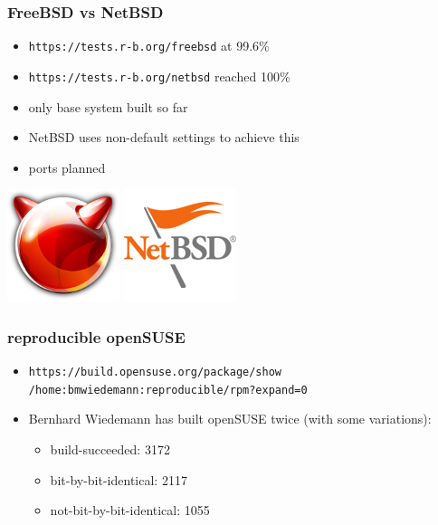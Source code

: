\documentclass[14pt]{beamer}
\begin{document}
\begin{frame}
 \frametitle{FreeBSD vs NetBSD}
 \begin{itemize}
  \item \texttt{https://tests.r-b.org/freebsd} at 99.6\%
  \item \texttt{https://tests.r-b.org/netbsd} reached 100\%
  \item<2> only base system built so far
  \item<2> NetBSD uses non-default settings to achieve this
  \item<2> ports planned
 \end{itemize}
 \begin{center}
  \includegraphics[height=0.13\paperheight]{images/freebsd.png}
  \hspace{0.05\paperwidth}
  \includegraphics[height=0.13\paperheight]{images/netbsd.png}
\end{center}
\end{frame}


\begin{frame}
 \frametitle{reproducible openSUSE}
 \begin{itemize}
  \item
  \small{\texttt{https://build.opensuse.org/package/show \\
  /home:bmwiedemann:reproducible/rpm?expand=0}}
  \item Bernhard Wiedemann has built openSUSE twice (with some variations):
  \begin{itemize}
   \item build-succeeded: 3172
   \item bit-by-bit-identical: 2117
   \item not-bit-by-bit-identical: 1055
 \end{itemize}
 \end{itemize}
\end{frame}
\end{document}
